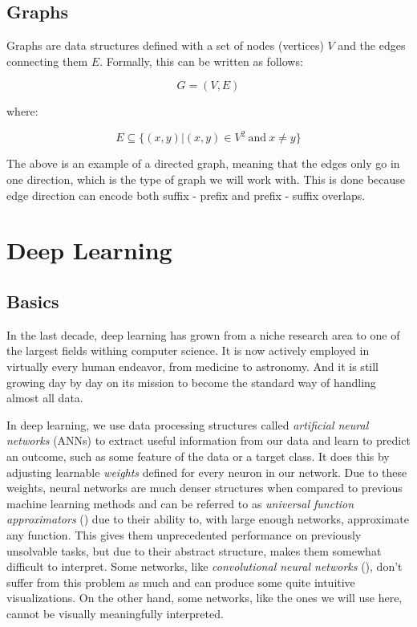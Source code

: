 \documentclass[times, utf8, diplomski, english]{fer_eng}
\begin{document}
\subsection{Graphs}

Graphs are data structures defined with a set of nodes (vertices) $V$ and the edges connecting them $E$. Formally, this can be written as follows:

\[ G = (V, E) \]

where:

\[ E \subseteq 	\{ (x, y)|(x, y) \in V^2 \mathrm{\ and\ } x \neq y \} \]

The above is an example of a directed graph, meaning that the edges only go in one direction, which is the type of graph we will work with. This is done because edge direction can encode both suffix - prefix and prefix - suffix overlaps.

\section{Deep Learning}

\subsection{Basics}

In the last decade, deep learning has grown from a niche research area to one of the largest fields withing computer science. It is now actively employed in virtually every human endeavor, from medicine to astronomy. And it is still growing day by day on its mission to become the standard way of handling almost all data.

In deep learning, we use data processing structures called \textit{artificial neural networks} (ANNs) to extract useful information from our data and learn to predict an outcome, such as some feature of the data or a target class. It does this by adjusting learnable \textit{weights} defined for every neuron in our network. Due to these weights, neural networks are much denser structures when compared to previous machine learning methods and can be referred to as \textit{universal function approximators} (\cite{uni_approx}) due to their ability to, with large enough networks, approximate any function. This gives them unprecedented performance on previously unsolvable tasks, but due to their abstract structure, makes them somewhat difficult to interpret. Some networks, like \textit{convolutional neural networks} (\cite{CNN}), don't suffer from this problem as much and can produce some quite intuitive visualizations. On the other hand, some networks, like the ones we will use here, cannot be visually meaningfully interpreted.
\end{document}
